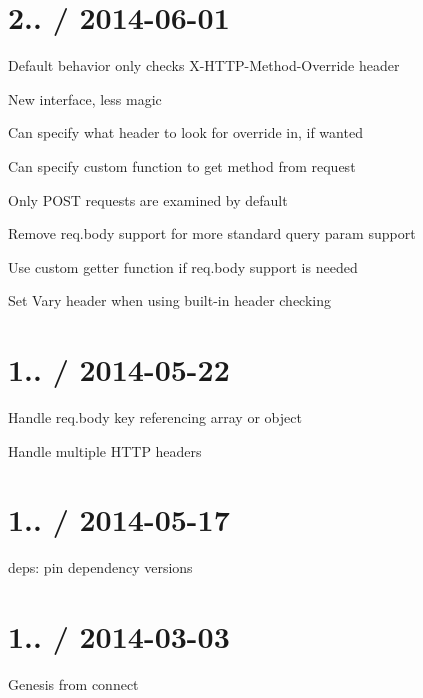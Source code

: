 \section*{2.. / 2014-\/06-\/01 }


\begin{DoxyItemize}
\item Default behavior only checks {\ttfamily X-\/\+H\+T\+T\+P-\/\+Method-\/\+Override} header
\item New interface, less magic
\begin{DoxyItemize}
\item Can specify what header to look for override in, if wanted
\item Can specify custom function to get method from request
\end{DoxyItemize}
\item Only {\ttfamily P\+O\+ST} requests are examined by default
\item Remove {\ttfamily req.\+body} support for more standard query param support
\begin{DoxyItemize}
\item Use custom {\ttfamily getter} function if {\ttfamily req.\+body} support is needed
\end{DoxyItemize}
\item Set {\ttfamily Vary} header when using built-\/in header checking
\end{DoxyItemize}

\section*{1.. / 2014-\/05-\/22 }


\begin{DoxyItemize}
\item Handle {\ttfamily req.\+body} key referencing array or object
\item Handle multiple H\+T\+TP headers
\end{DoxyItemize}

\section*{1.. / 2014-\/05-\/17 }


\begin{DoxyItemize}
\item deps\+: pin dependency versions
\end{DoxyItemize}

\section*{1.. / 2014-\/03-\/03 }


\begin{DoxyItemize}
\item Genesis from {\ttfamily connect} 
\end{DoxyItemize}